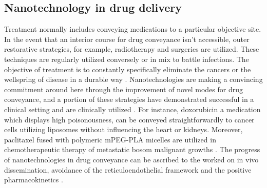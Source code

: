\documentclass{article}
\begin{document}
\subsection*{ Nanotechnology in drug delivery }
Treatment normally includes conveying medications to a particular objective site. In the event that an interior course for drug conveyance isn't accessible, outer restorative strategies, for example, radiotherapy and surgeries are utilized. These techniques are regularly utilized conversely or in mix to battle infections. The objective of treatment is to constantly specifically eliminate the cancers or the wellspring of disease in a durable way . Nanotechnologies are making a convincing commitment around here through the improvement of novel modes for drug conveyance, and a portion of these strategies have demonstrated successful in a clinical setting and are clinically utilized . For instance, doxorubicin a medication which displays high poisonousness, can be conveyed straightforwardly to cancer cells utilizing liposomes  without influencing the heart or kidneys. Moreover, paclitaxel fused with polymeric mPEG-PLA micelles are utilized in chemotherapeutic therapy of metastatic bosom malignant growths . The progress of nanotechnologies in drug conveyance can be ascribed to the worked on in vivo dissemination, avoidance of the reticuloendothelial framework and the positive pharmacokinetics .

 
\end{document}
